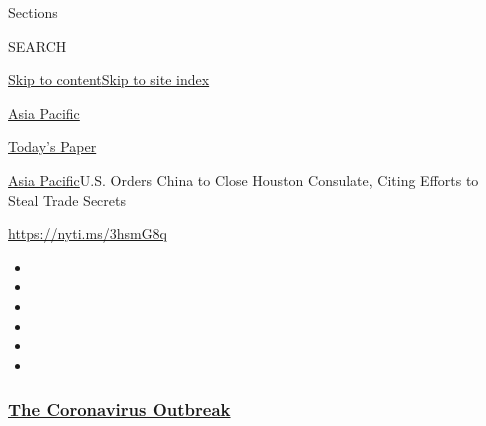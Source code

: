 Sections

SEARCH

\protect\hyperlink{site-content}{Skip to
content}\protect\hyperlink{site-index}{Skip to site index}

\href{https://www.nytimes3xbfgragh.onion/section/world/asia}{Asia
Pacific}

\href{https://myaccount.nytimes3xbfgragh.onion/auth/login?response_type=cookie\&client_id=vi}{}

\href{https://www.nytimes3xbfgragh.onion/section/todayspaper}{Today's
Paper}

\href{/section/world/asia}{Asia Pacific}\textbar{}U.S. Orders China to
Close Houston Consulate, Citing Efforts to Steal Trade Secrets

\url{https://nyti.ms/3hsmG8q}

\begin{itemize}
\item
\item
\item
\item
\item
\item
\end{itemize}

\hypertarget{the-coronavirus-outbreak}{%
\subsubsection{\texorpdfstring{\href{https://www.nytimes3xbfgragh.onion/news-event/coronavirus?name=styln-coronavirus-national\&region=TOP_BANNER\&block=storyline_menu_recirc\&action=click\&pgtype=Article\&impression_id=aa165ca0-efb6-11ea-ba7d-2b22bdc536a2\&variant=undefined}{The
Coronavirus
Outbreak}}{The Coronavirus Outbreak}}\label{the-coronavirus-outbreak}}

